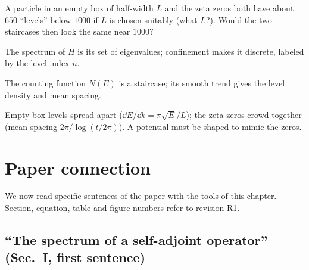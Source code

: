 \begin{checkpoint}
A particle in an empty box of half-width $L$ and the zeta zeros both have about $650$ ``levels'' below $1000$ if $L$ is chosen suitably (what $L$?). Would the two staircases then look the same near $1000$?
\end{checkpoint}

\begin{keyideas}
\item The spectrum of $H$ is its set of eigenvalues; confinement makes it discrete, labeled by the level index $n$.
\item The counting function $N(E)$ is a staircase; its smooth trend gives the level density and mean spacing.
\item Empty-box levels spread apart ($\dd E/\dd k=\pi\sqrt E/L$); the zeta zeros crowd together (mean spacing $2\pi/\log(t/2\pi)$). A potential must be shaped to mimic the zeros.
\end{keyideas}

\section{Paper connection}\label{sec:schrodinger-paper}

We now read specific sentences of the paper \cite{soniR1} with the tools of this chapter. Section, equation, table and figure numbers refer to revision R1.

\subsection{``The spectrum of a self-adjoint operator'' (Sec.~I, first sentence)}

